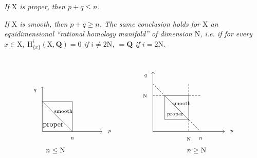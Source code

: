 \documentclass[11pt,leqno]{article}
\newcommand{\Page}[1]{\ifvmode\noindent\else\unskip\ \fi{\footnotesize\textcolor{gray}{[p.\,#1]}}\ \ignorespaces}
\begin{document}
\noindent\hspace*{\parindent}
\textit{If \(\mathrm{X}\) is proper, then \(p+q\leq n\).}

\noindent\hspace*{\parindent}
\textit{If \(\mathrm{X}\) is smooth, then \(p+q\geq n\). The same conclusion holds for \(\mathrm{X}\) an equidimensional “rational homology manifold” of dimension \(\mathrm{N}\), \textup{i.e.} if for every \(x\in\mathrm{X}\), \(\mathrm{H}^i_{\{x\}}(\mathrm{X},\mathbf{Q})=0\) if \(i\neq2\mathrm{N}\), \(=\mathbf{Q}\) if \(i=2\mathrm{N}\).}

\Page{39}
\[
\begin{tikzcd}[
  baseline=(current bounding box.south),
  row sep=7mm,column sep=7mm,
  cells={nodes={inner sep=0pt,outer sep=0pt,text height=0pt,text depth=0pt}},
  arrows={start anchor=center,end anchor=center}
]
{} & {} & {} & {} & {}\\
{} \arrow[rr,no head,"\text{smooth}"'{pos=.7,yshift=-3mm}]
   \arrow[ddrr,no head]
 & {}
 & {} \arrow[dd,no head,"n"{pos=1,anchor=north,yshift=-2mm}]
 & {} & {}\\
{} & {} & {} & {} & {}\\
{} \arrow[uuu,"q"{pos=1,anchor=east,xshift=-2mm,yshift=-2mm}]
   \arrow[rrrr,"p"{pos=1,anchor=west,xshift=2mm}]
   \arrow[rrrr,phantom,"\text{proper}"{pos=.18,anchor=south,yshift=1mm}]
   \arrow[rrrr,phantom,"n\leq\mathrm{N}"'{pos=.22,anchor=north,yshift=-7mm}]
 & {} & {} & {} & {}
\end{tikzcd}
\qquad\qquad
\begin{tikzcd}[
  baseline=(current bounding box.south),
  row sep=5.5mm,column sep=5.5mm,
  cells={nodes={inner sep=0pt,outer sep=0pt,text height=0pt,text depth=0pt}},
  arrows={start anchor=center,end anchor=center}
]
{} & {} & {} & {} & {} & {} & {}\\
{} \arrow[dr,dashed,no head]
 & {} & {}
 & {} \arrow[d,dashed,no head]
 & {} & {} & {}\\
{} \arrow[r,dashed,no head,"\mathrm{N}"{pos=0,anchor=east,xshift=-2mm}]
 & {} \arrow[rr,no head,"\text{smooth}"'{pos=.7,yshift=-2mm}]
      \arrow[dd,no head]
      \arrow[ddrr,no head]
 & {}
 & {} \arrow[r,dashed,no head] \arrow[dd,no head]
 & {} & {} & {}\\
{} & {} & {} & {} & {} & {} & {}\\
{} & {} \arrow[rr,no head,"\text{proper}"{pos=.43,anchor=south,yshift=.7mm}]
 & {}
 & {} \arrow[dr,dashed,no head,"n"{pos=1,anchor=north,yshift=-2mm}]
      \arrow[d,dashed,no head,"\mathrm{N}"{pos=1,anchor=north,yshift=-2mm}]
 & {} & {} & {}\\
{} \arrow[uuuuu,"q"{pos=1,anchor=east,xshift=-2mm,yshift=-2mm}]
   \arrow[rrrrrr,"p"{pos=1,anchor=west,xshift=2mm}]
   \arrow[rrrrrr,phantom,"n\geq\mathrm{N}"'{pos=.61,anchor=north,yshift=-7mm}]
 & {} & {} & {} & {} & {} & {}
\end{tikzcd}
\]
\end{document}
